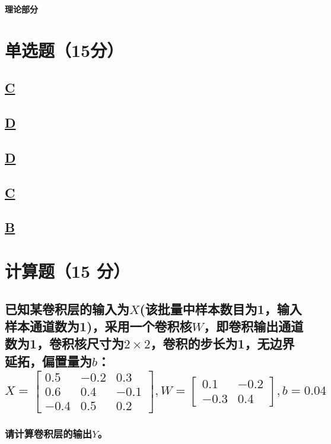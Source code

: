 \documentclass[a4paper]{article}
\begin{document}
\courseheader
{}
\vspace{3mm}
\centerline{\textbf{\Large{理论部分}}}

\section{单选题（15分）}
\subsection{\underline{C}}

\subsection{\underline{D}}

\subsection{\underline{D}}

\subsection{\underline{C}}

\subsection{\underline{B}}

\section{计算题（15 分）}
\subsection{
已知某卷积层的输入为$X$(该批量中样本数目为1，输入样本通道数为1)，采用一个卷积核$W$，即卷积输出通道数为1，卷积核尺寸为$2\times 2$，卷积的步长为1，无边界延拓，偏置量为$b$：
$$X=\left[ \begin{array}{ccc}
    0.5 & -0.2 & 0.3 \\
    0.6 & 0.4 & -0.1 \\
    -0.4 & 0.5 & 0.2
\end{array}\right],
W=\left[ \begin{array}{cc}
    0.1 & -0.2  \\
    -0.3 & 0.4
\end{array}\right], b=0.04$$
}
\subsubsection{请计算卷积层的输出$Y$。}
\end{document}
